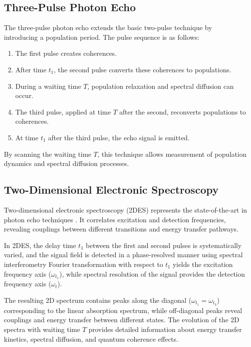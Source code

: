 \subsection{Three-Pulse Photon Echo}
\label{subsec:three_pulse_echo}

\noindent The three-pulse photon echo extends the basic two-pulse technique by introducing a population period. The pulse sequence is as follows:

\begin{enumerate}
	\item The first pulse creates coherences.
	\item After time $t_1$, the second pulse converts these coherences to populations.
	\item During a waiting time $T$, population relaxation and spectral diffusion can occur.
	\item The third pulse, applied at time $T$ after the second, reconverts populations to coherences.
	\item At time $t_1$ after the third pulse, the echo signal is emitted.
\end{enumerate}

\noindent By scanning the waiting time $T$, this technique allows measurement of population dynamics and spectral diffusion processes.

\subsection{Two-Dimensional Electronic Spectroscopy}
\label{subsec:2d_spectroscopy}

\noindent Two-dimensional electronic spectroscopy (2DES) represents the state-of-the-art in photon echo techniques \cite{jonas2003twodimensionalfemtosecondspectroscopy, brixneretal2004phasestabilizedtwodimensionalelectronic, schlau-cohenetal2011twodimensionalelectronicspectroscopy}. It correlates excitation and detection frequencies, revealing couplings between different transitions and energy transfer pathways.

\noindent In 2DES, the delay time $t_1$ between the first and second pulses is systematically varied, and the signal field is detected in a phase-resolved manner using spectral interferometry %
Fourier transformation with respect to $t_1$ yields the excitation frequency axis ($\omega_{t_1}$), while spectral resolution of the signal provides the detection frequency axis ($\omega_t$).

\noindent The resulting 2D spectrum contains peaks along the diagonal ($\omega_{t_1} = \omega_{t_3}$) corresponding to the linear absorption spectrum, while off-diagonal peaks reveal couplings and energy transfer between different states. The evolution of the 2D spectra with waiting time $T$ provides detailed information about energy transfer kinetics, spectral diffusion, and quantum coherence effects.


